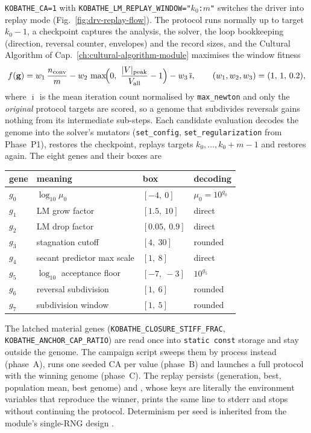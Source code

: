 \texttt{KOBATHE\_CA=1} with
\texttt{KOBATHE\_LM\_REPLAY\_WINDOW="$k_0$:$m$"} switches the driver into
replay mode (Fig.~\ref{fig:drv-replay-flow}). The protocol runs normally
up to target $k_0-1$, a checkpoint captures the analysis, the solver, the
loop bookkeeping (direction, reversal counter, envelopes) and the record
sizes, and the Cultural Algorithm of
Cap.~\ref{ch:cultural-algorithm-module} maximises the window fitness
%
\[
  f(\mathbf g) = w_1\,\frac{n_{\mathrm{conv}}}{m}
   - w_2\,\max\!\Bigl(0,\ \frac{|V|_{\mathrm{peak}}}{V_{\mathrm{all}}}-1\Bigr)
   - w_3\,\overline{\imath},
  \qquad (w_1,w_2,w_3) = (1,\,1,\,0.2),
\]
%
where $\overline{\imath}$ is the mean iteration count normalised by
\texttt{max\_newton} and only the \emph{original} protocol targets are
scored, so a genome that subdivides reversals gains nothing from its
intermediate sub-steps. Each candidate evaluation decodes the genome into
the solver's mutators (\texttt{set\_config}, \texttt{set\_regularization}
from Phase~P1), restores the checkpoint, replays targets
$k_0,\dots,k_0{+}m{-}1$ and restores again. The eight genes and their
boxes are
%
\begin{center}
\begin{tabular}{@{}llll@{}}
\toprule
gene & meaning & box & decoding \\
\midrule
$g_0$ & $\log_{10}\mu_0$              & $[-4,\ 0]$    & $\mu_0 = 10^{g_0}$ \\
$g_1$ & LM grow factor                & $[1.5,\ 10]$  & direct \\
$g_2$ & LM drop factor                & $[0.05,\ 0.9]$& direct \\
$g_3$ & stagnation cutoff             & $[4,\ 30]$    & rounded \\
$g_4$ & secant predictor max scale    & $[1,\ 8]$     & direct \\
$g_5$ & $\log_{10}$ acceptance floor  & $[-7,\ -3]$   & $10^{g_5}$ \\
$g_6$ & reversal subdivision          & $[1,\ 6]$     & rounded \\
$g_7$ & subdivision window            & $[1,\ 5]$     & rounded \\
\bottomrule
\end{tabular}
\end{center}
%
The latched material genes (\texttt{KOBATHE\_CLOSURE\_STIFF\_FRAC},
\texttt{KOBATHE\_ANCHOR\_CAP\_RATIO}) are read once into
\texttt{static const} storage and stay outside the genome. The campaign
script  sweeps them by process instead
(phase~A), runs one seeded CA per value (phase~B) and launches a full
protocol with the winning genome (phase~C). The replay persists
 (generation, best, population mean, best genome)
and , whose keys are literally the environment
variables that reproduce the winner, prints the same line to stderr and
stops without continuing the protocol. Determinism per seed is inherited
from the module's single-RNG design \cite{Reynolds1994Cultural}.

